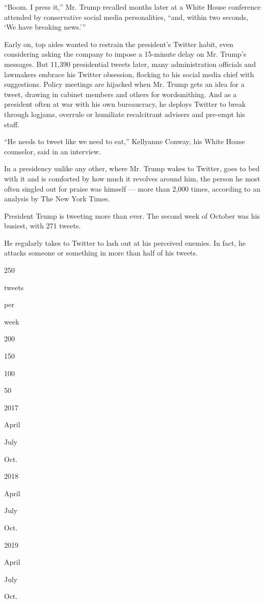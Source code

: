 ``Boom. I press it,'' Mr. Trump recalled months later at a White House
conference attended by conservative social media personalities, ``and,
within two seconds, `We have breaking news.'''

Early on, top aides wanted to restrain the president's Twitter habit,
even considering asking the company to impose a 15-minute delay on Mr.
Trump's messages. But 11,390 presidential tweets later, many
administration officials and lawmakers embrace his Twitter obsession,
flocking to his social media chief with suggestions. Policy meetings are
hijacked when Mr. Trump gets an idea for a tweet, drawing in cabinet
members and others for wordsmithing. And as a president often at war
with his own bureaucracy, he deploys Twitter to break through logjams,
overrule or humiliate recalcitrant advisers and pre-empt his staff.

``He needs to tweet like we need to eat,'' Kellyanne Conway, his White
House counselor, said in an interview.

In a presidency unlike any other, where Mr. Trump wakes to Twitter, goes
to bed with it and is comforted by how much it revolves around him, the
person he most often singled out for praise was himself --- more than
2,000 times, according to an analysis by The New York Times.

President Trump is tweeting more than ever. The second week of October
was his busiest, with 271 tweets.

He regularly takes to Twitter to lash out at his perceived enemies. In
fact, he attacks someone or something in more than half of his tweets.

250

tweets

per

week

200

150

100

50

2017

April

July

Oct.

2018

April

July

Oct.

2019

April

July

Oct.

